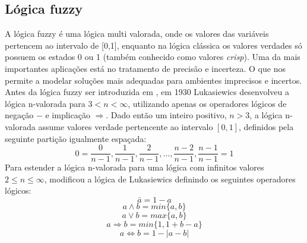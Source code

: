 \subsection{Lógica fuzzy}

A lógica fuzzy é uma lógica multi valorada, onde os valores das variáveis pertencem ao intervalo
de [0,1], enquanto na lógica clássica os valores verdades só possuem os estados 0 ou 1 (também conhecido como valores {\it crisp\/}). Uma da mais importantes aplicações está no tratamento de precisão e incerteza. O que nos permite a modelar soluções mais adequadas para ambientes imprecisos e incertos.
Antes da lógica fuzzy ser introduzida em \cite{Zadeh1965}, em 1930 Lukasiewics\cite{Chen2000} 
desenvolveu
a lógica n-valorada para $3 < n < \infty$, utilizando apenas os operadores lógicos de negação $-$ e implicação $\Rightarrow$. Dado então um inteiro positivo, $n > 3$, a lógica n-valorada assume 
valores verdade pertencente ao intervalo $[0,1]$, definidos pela seguinte partição igualmente 
espaçada: 
$$0 =  \frac{0}{n-1}, \frac{1}{n-1},\frac{2}{n-1},...,\frac{n-2}{n-1},\frac{n-1}{n-1} = 1$$
Para estender a lógica n-valorada para uma lógica com infinitos valores $2 \leq n \leq \infty$, 
\cite{Zadeh1965} modificou a lógica de Lukasiewics definindo os seguintes operadores lógicos:
$$\bar{a} = 1 -a$$
$$a \wedge b = min\{a,b\}$$
$$a \vee b = max\{a,b\}$$
$$a \Rightarrow b = min\{1, 1+b-a\}$$
$$a \Leftrightarrow  b = 1 - |a-b|$$

